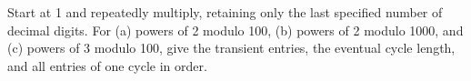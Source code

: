 Start at 1 and repeatedly multiply, retaining only the last specified number of decimal digits. For (a) powers of 2 modulo 100, (b) powers of 2 modulo 1000, and (c) powers of 3 modulo 100, give the transient entries, the eventual cycle length, and all entries of one cycle in order.
